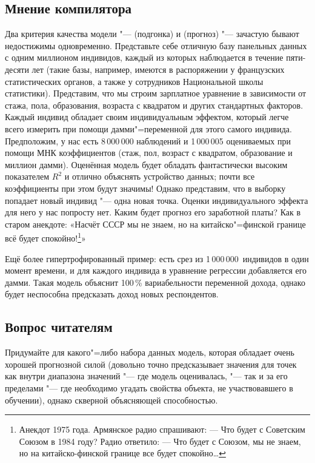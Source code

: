 \documentclass[11pt]{article}
\begin{document}
\subsection{Мнение компилятора}

Два критерия качества модели "---  (подгонка) и  (прогноз) "--- зачастую бывают недостижимы одновременно. Представьте себе отличную базу панельных данных с одним миллионом индивидов, каждый из которых наблюдается в течение пяти-десяти лет (такие базы, например, имеются в распоряжении у французских статистических органов, а также у сотрудников Национальной школы статистики). Представим, что мы строим зарплатное уравнение в зависимости от стажа, пола, образования, возраста с квадратом и других стандартных факторов. Каждый индивид обладает своим индивидуальным эффектом, который легче всего измерить при помощи дамми"=переменной для этого самого индивида. Предположим, у нас есть 8\,000\,000 наблюдений и 1\,000\,005 оцениваемых при помощи МНК коэффициентов (стаж, пол, возраст с квадратом, образование и миллион дамми). Оценённая модель будет обладать фантастически высоким показателем $R^2$ и отлично объяснять устройство данных; почти все коэффициенты при этом будут значимы! Однако представим, что в выборку попадает новый индивид "--- одна новая точка. Оценки индивидуального эффекта для него у нас попросту нет. Каким будет прогноз его заработной платы? Как в старом анекдоте: «Насчёт СССР мы не знаем, но на китайско"=финской границе всё будет спокойно!\footnote{Анекдот 1975 года. Армянское радио спрашивают: --- Что будет с Советским Союзом в 1984 году? Радио ответило: --- Что будет с Союзом, мы не знаем, но на китайско-финской границе все будет спокойно\ldots}»

Ещё более гипертрофированный пример: есть срез из 1\,000\,000~индивидов в один момент времени, и для каждого индивида в уравнение регрессии добавляется его дамми. Такая модель объяснит 100\,\% вариабельности переменной дохода, однако будет неспособна предсказать доход новых респондентов.

\subsection{Вопрос читателям}

Придумайте для какого"=либо набора данных модель, которая обладает очень хорошей прогнозной силой (довольно точно предсказывает значения для точек как внутри диапазона значений "--- где модель оценивалась, "--- так и за его пределами "--- где необходимо угадать свойства объекта, не участвовавшего в обучении), однако скверной объясняющей способностью.
\end{document}

